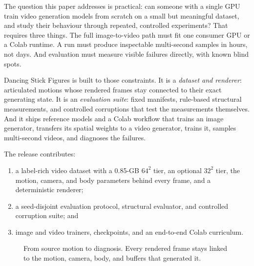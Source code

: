 \documentclass[10pt,twocolumn]{article}
\begin{document}
The question this paper addresses is practical: can someone with a single GPU train video generation models
from scratch on a small but meaningful dataset, and study their behaviour through repeated, controlled
experiments? That requires three things. The full image-to-video path must fit one consumer GPU or a Colab
runtime. A run must produce inspectable multi-second samples in hours, not days. And evaluation must measure
visible failures directly, with known blind spots.

Dancing Stick Figures is built to those constraints. It is a \emph{dataset and renderer}: articulated motions
whose rendered frames stay connected to their exact generating state. It is an \emph{evaluation suite}: fixed
manifests, rule-based structural measurements, and controlled corruptions that test the measurements
themselves. And it ships reference models and a Colab workflow that trains an image generator, transfers its
spatial weights to a video generator, trains it, samples multi-second videos, and diagnoses the failures.

The release contributes:
\begin{enumerate}
\item a label-rich video dataset with a 0.85-GB $64^2$ tier, an optional $32^2$ tier, the motion, camera, and
body parameters behind every frame, and a deterministic renderer;
\item a seed-disjoint evaluation protocol, structural evaluator, and controlled corruption suite; and
\item image and video trainers, checkpoints, and an end-to-end Colab curriculum.
\end{enumerate}

\begin{figure}[t]\centering
{}
\caption{From source motion to diagnosis. Every rendered frame stays linked to the motion, camera, body, and
buffers that generated it.}\label{fig:loop}
\end{figure}
\end{document}

